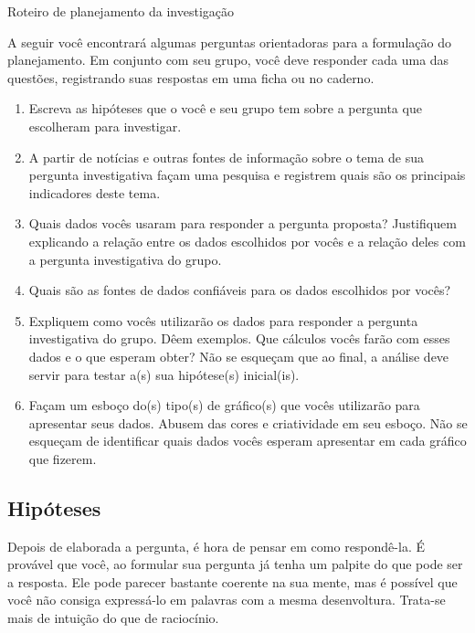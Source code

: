 \label{etapa3}

\begin{task}{Roteiro de planejamento da investigação}

A seguir você encontrará algumas perguntas orientadoras para a formulação do planejamento. Em conjunto com seu grupo, você deve responder cada uma das questões, registrando suas respostas em uma ficha ou no caderno. 

\begin{enumerate}[label=\titem{\arabic*)}]
\item Escreva as hipóteses que o você e seu grupo tem sobre a pergunta que escolheram para investigar.

\item A partir de notícias e outras fontes de informação sobre o tema de sua pergunta investigativa façam uma pesquisa e registrem quais são os principais indicadores deste tema.

\item Quais dados vocês usaram para responder a pergunta proposta? Justifiquem explicando a relação entre os dados escolhidos por vocês e a relação deles com a pergunta investigativa do grupo.

\item Quais são as fontes de dados confiáveis para os dados escolhidos por vocês?

\item Expliquem como vocês utilizarão os dados para responder a pergunta investigativa do grupo. Dêem exemplos. Que cálculos vocês farão com esses dados e o que esperam obter? Não se esqueçam que ao final, a análise deve servir para testar a(s) sua hipótese(s) inicial(is).

\item Façam um esboço do(s) tipo(s) de gráfico(s) que vocês utilizarão para apresentar seus dados. Abusem das cores e criatividade em seu esboço. Não se esqueçam de identificar quais dados vocês esperam apresentar em cada gráfico que fizerem. 
\end{enumerate}
\end{task}

\subsection{Hipóteses}

Depois de elaborada a pergunta, é hora de pensar em como respondê-la. É provável que você, ao formular sua pergunta já tenha um palpite do que pode ser a resposta. Ele pode parecer bastante coerente na sua mente, mas é possível que você não consiga expressá-lo em palavras com a mesma desenvoltura. Trata-se mais de intuição do que de raciocínio.

